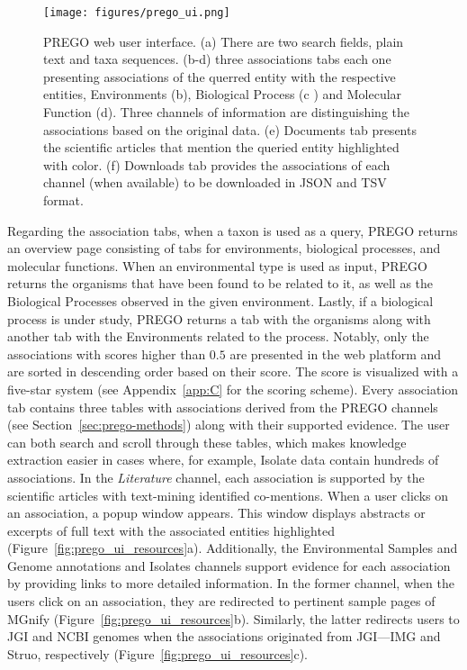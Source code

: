    \begin{figure}[h]
      \centering
      \texttt{[image: figures/prego\_ui.png]}
      \caption[PREGO web user interface]{
         PREGO web user interface. 
         (a) There are two search fields, plain text and taxa sequences. 
         (b-d) three associations tabs each one presenting associations of the querred entity with the respective entities, Environments (b), Biological Process (c ) and Molecular Function (d). 
         Three channels of information are distinguishing the associations based on the original data. 
         (e) Documents tab presents the scientific articles that mention the queried entity highlighted with color. 
         (f) Downloads tab provides the associations of each channel (when available) to be downloaded in JSON and TSV format.
      }
      \label{fig:prego_ui}
   \end{figure}


   Regarding the association tabs, when a taxon is used as a query, PREGO returns an overview page consisting of tabs for environments, biological processes, and molecular functions. When an environmental type is used as input, PREGO returns the organisms that have been found to be related to it, as well as the Biological Processes observed in the given environment. 
   Lastly, if a biological process is under study, PREGO returns a tab with the organisms along with another tab with the Environments related to the process. 
   Notably, only the associations with scores higher than $0.5$ are presented in the web platform and are sorted in descending order based on their score. 
   The score is visualized with a five-star system (see Appendix~\ref{app:C} for the scoring scheme).
   Every association tab contains three tables with associations derived from the PREGO channels (see Section~\ref{sec:prego-methods}) along with their supported evidence. 
   The user can both search and scroll through these tables, which makes knowledge extraction easier in cases where, for example, Isolate data contain hundreds of associations. 
   In the \textit{Literature} channel, each association is supported by the scientific articles with text-mining identified co-mentions. 
   When a user clicks on an association, a popup window appears. This window displays abstracts or excerpts of full text with the associated entities highlighted (Figure~\ref{fig:prego_ui_resources}a). 
   Additionally, the Environmental Samples and Genome annotations and Isolates channels support evidence for each association by providing links to more detailed information. 
   In the former channel, when the users click on an association, they are redirected to pertinent sample pages of MGnify (Figure~\ref{fig:prego_ui_resources}b). 
   Similarly, the latter redirects users to JGI and NCBI genomes when the associations originated from JGI—IMG and Struo, respectively (Figure~\ref{fig:prego_ui_resources}c).



